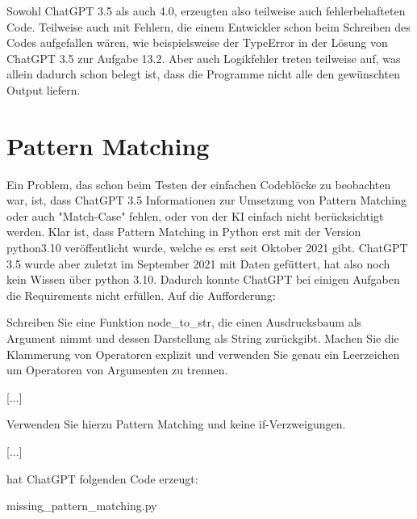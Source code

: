 \documentclass[class=scrbook, crop=false]{standalone}
\begin{document}
    Sowohl ChatGPT 3.5 als auch 4.0, erzeugten also teilweise auch fehlerbehafteten Code.
    Teilweise auch mit Fehlern, die einem Entwickler schon beim Schreiben des Codes aufgefallen wären, wie beispielsweise
    der TypeError in der Lösung von ChatGPT 3.5 zur Aufgabe 13.2. Aber auch Logikfehler treten teilweise auf, was allein
    dadurch schon belegt ist, dass die Programme nicht alle den gewünschten Output liefern.

\section{Pattern Matching}
\label{sec:pattern_matching}
    Ein Problem, das schon beim Testen der einfachen Codeblöcke zu beobachten war, ist, dass ChatGPT 3.5 Informationen
    zur Umsetzung von Pattern Matching oder auch "Match-Case" fehlen, oder von der KI einfach nicht berücksichtigt werden.
    Klar ist, dass Pattern Matching in Python erst mit der Version python3.10 veröffentlicht wurde, welche es erst seit Oktober 2021 gibt.
    ChatGPT 3.5 wurde aber zuletzt im September 2021 mit Daten gefüttert, hat also noch kein Wissen über python 3.10.
    Dadurch konnte ChatGPT bei einigen Aufgaben die Requirements nicht erfüllen.
    Auf die Aufforderung:
    \begin{displayquote}
        Schreiben Sie eine Funktion node\_to\_str, die einen Ausdrucksbaum als Argument nimmt und dessen Darstellung als String
        zurückgibt.
        Machen Sie die Klammerung von Operatoren explizit und verwenden Sie genau ein Leerzeichen um Operatoren
        von Argumenten zu trennen.

        [...]

        Verwenden Sie hierzu Pattern Matching und keine if-Verzweigungen.

        [...]
    \end{displayquote}

    hat ChatGPT folgenden Code erzeugt:
    
    {missing_pattern_matching.py}
\end{document}
